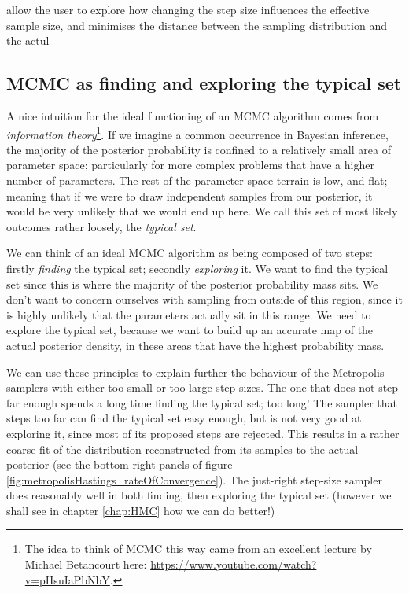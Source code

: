 \documentclass[11pt,fullpage]{book}
\begin{document}
 allow the user to explore how changing the step size influences the effective sample size, and minimises the distance between the sampling distribution and the actul

\subsection{MCMC as finding and exploring the typical set}
A nice intuition for the ideal functioning of an MCMC algorithm comes from \textit{information theory}\footnote{The idea to think of MCMC this way came from an excellent lecture by Michael Betancourt here: \url{https://www.youtube.com/watch?v=pHsuIaPbNbY}.}. If we imagine a common occurrence in Bayesian inference, the majority of the posterior probability is confined to a relatively small area of parameter space; particularly for more complex problems that have a higher number of parameters. The rest of the parameter space terrain is low, and flat; meaning that if we were to draw independent samples from our posterior, it would be very unlikely that we would end up here. We call this set of most likely outcomes rather loosely, the \textit{typical set}.

We can think of an ideal MCMC algorithm as being composed of two steps: firstly \textit{finding} the typical set; secondly \textit{exploring} it. We want to find the typical set since this is where the majority of the posterior probability mass sits. We don't want to concern ourselves with sampling from outside of this region, since it is highly unlikely that the parameters actually sit in this range. We need to explore the typical set, because we want to build up an accurate map of the actual posterior density, in these areas that have the highest probability mass. 

We can use these principles to explain further the behaviour of the Metropolis samplers with either too-small or too-large step sizes. The one that does not step far enough spends a long time finding the typical set; too long! The sampler that steps too far can find the typical set easy enough, but is not very good at exploring it, since most of its proposed steps are rejected. This results in a rather coarse fit of the distribution reconstructed from its samples to the actual posterior (see the bottom right panels of figure \ref{fig:metropolisHastings_rateOfConvergence}). The just-right step-size sampler does reasonably well in both finding, then exploring the typical set (however we shall see in chapter \ref{chap:HMC} how we can do better!)
\end{document}
